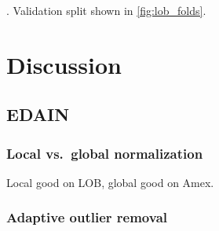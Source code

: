 \documentclass{statsmsc}
\begin{document}
{%


. Validation split shown in \cref{fig:lob_folds}.



\chapter{Discussion} %


\section{EDAIN}%
\label{sec:EDAIN-discuss}

\subsection{Local vs.\ global normalization}%
\label{sub:local_vs_global}

Local good on LOB, global good on Amex.



\subsection{Adaptive outlier removal}%
\label{sub:Adaptive outlier removal}

}
\end{document}
